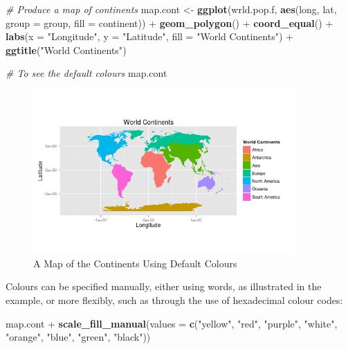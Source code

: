\documentclass[]{article}
\newenvironment{Shaded}{}{}
\newcommand{\KeywordTok}[1]{\textcolor[rgb]{0.00,0.44,0.13}{\textbf{{#1}}}}
\newcommand{\DataTypeTok}[1]{\textcolor[rgb]{0.56,0.13,0.00}{{#1}}}
\newcommand{\StringTok}[1]{\textcolor[rgb]{0.25,0.44,0.63}{{#1}}}
\newcommand{\CommentTok}[1]{\textcolor[rgb]{0.38,0.63,0.69}{\textit{{#1}}}}
\newcommand{\NormalTok}[1]{{#1}}
\let\Oldincludegraphics\includegraphics
\renewcommand{\includegraphics}[1]{\Oldincludegraphics[width=10cm]{#1}}
\begin{document}
\begin{Shaded}
\begin{Highlighting}[]
\CommentTok{# Produce a map of continents}
\NormalTok{map.cont <- }\KeywordTok{ggplot}\NormalTok{(wrld.pop.f, }\KeywordTok{aes}\NormalTok{(long, lat, }\DataTypeTok{group =} \NormalTok{group, }\DataTypeTok{fill =} \NormalTok{continent)) + }
    \KeywordTok{geom_polygon}\NormalTok{() + }\KeywordTok{coord_equal}\NormalTok{() + }\KeywordTok{labs}\NormalTok{(}\DataTypeTok{x =} \StringTok{"Longitude"}\NormalTok{, }\DataTypeTok{y =} \StringTok{"Latitude"}\NormalTok{, }\DataTypeTok{fill =} \StringTok{"World Continents"}\NormalTok{) + }
    \KeywordTok{ggtitle}\NormalTok{(}\StringTok{"World Continents"}\NormalTok{)}

\CommentTok{# To see the default colours}
\NormalTok{map.cont}
\end{Highlighting}
\end{Shaded}
\begin{figure}[htbp]
\centering
\includegraphics{figure/A_Map_of_the_Continents_Using_Default_Colours.png}
\caption{A Map of the Continents Using Default Colours} \label{fworldconts}
\end{figure}

Colours can be specified manually, either using words, as illustrated in the example, or more flexibly, such as through the use of hexadecimal colour codes:

\begin{Shaded}
\begin{Highlighting}[]
\NormalTok{map.cont + }\KeywordTok{scale_fill_manual}\NormalTok{(}\DataTypeTok{values =} \KeywordTok{c}\NormalTok{(}\StringTok{"yellow"}\NormalTok{, }\StringTok{"red"}\NormalTok{, }\StringTok{"purple"}\NormalTok{, }\StringTok{"white"}\NormalTok{, }
    \StringTok{"orange"}\NormalTok{, }\StringTok{"blue"}\NormalTok{, }\StringTok{"green"}\NormalTok{, }\StringTok{"black"}\NormalTok{))}
\end{Highlighting}
\end{Shaded}
\end{document}
